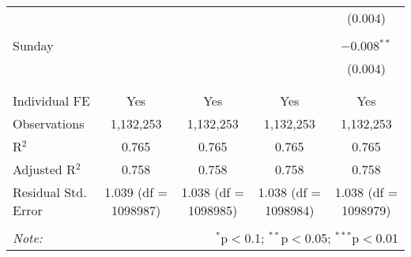 \documentclass[
]{article}
\begin{document}
\begin{table}[!htbp]
{\begin{tabular}{@{\extracolsep{5pt}}lcccc}
  &  &  &  & (0.004) \\ 
  & & & & \\ 
 Sunday &  &  &  & $-$0.008$^{**}$ \\ 
  &  &  &  & (0.004) \\ 
  & & & & \\ 
\hline \\[-1.8ex] 
Individual FE & Yes & Yes & Yes & Yes \\ 
Observations & 1,132,253 & 1,132,253 & 1,132,253 & 1,132,253 \\ 
R$^{2}$ & 0.765 & 0.765 & 0.765 & 0.765 \\ 
Adjusted R$^{2}$ & 0.758 & 0.758 & 0.758 & 0.758 \\ 
Residual Std. Error & 1.039 (df = 1098987) & 1.038 (df = 1098985) & 1.038 (df = 1098984) & 1.038 (df = 1098979) \\ 
\hline 
\hline \\[-1.8ex] 
\textit{Note:}  & \multicolumn{4}{r}{$^{*}$p$<$0.1; $^{**}$p$<$0.05; $^{***}$p$<$0.01} \\ 
\end{tabular}
} 
\end{table} 
\newpage
\end{document}
